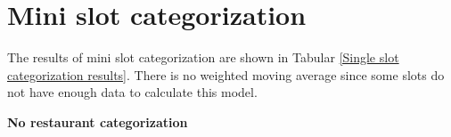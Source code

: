 \section{Mini slot categorization}\label{section:Single slot categorization}
The results of mini slot categorization are shown in Tabular \ref{Single slot categorization results}. There is no weighted moving average since some slots do not have enough data to calculate this model.
\begin{table}[h]
\centering
\caption{Mini slot categorization results}
\label{Single slot categorization results}
\end{table}
\newline\newline\textbf{No restaurant categorization}\newline
